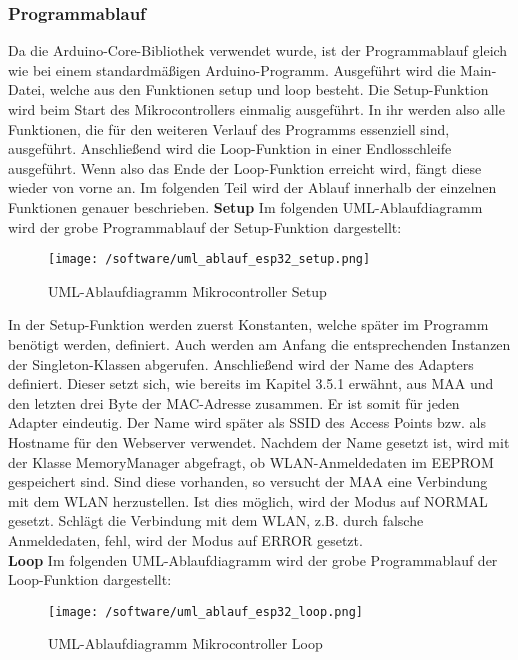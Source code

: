 \documentclass[11pt, twoside]{article}
\begin{document}
\subsubsection{Programmablauf}
Da die \glqq Arduino-Core\grqq{}-Bibliothek verwendet wurde, ist der Programmablauf gleich wie bei einem standardmäßigen Arduino-Programm. Ausgeführt wird die Main-Datei, welche aus den Funktionen \glqq setup\grqq{} und \glqq loop\grqq{} besteht. Die Setup-Funktion wird beim Start des Mikrocontrollers einmalig ausgeführt. In ihr werden also alle Funktionen, die für den weiteren Verlauf des Programms essenziell sind, ausgeführt. Anschließend wird die Loop-Funktion in einer Endlosschleife ausgeführt. Wenn also das Ende der Loop-Funktion erreicht wird, fängt diese wieder von vorne an. Im folgenden Teil wird der Ablauf innerhalb der einzelnen Funktionen genauer beschrieben.
\vspace{4mm}\newline
\textbf{Setup} \newline
Im folgenden UML-Ablaufdiagramm wird der grobe Programmablauf der Setup-Funktion dargestellt:
\begin{figure}[H]
	\texttt{[image: /software/uml\_ablauf\_esp32\_setup.png]}
\caption{UML-Ablaufdiagramm Mikrocontroller Setup}
\end{figure}
In der Setup-Funktion werden zuerst Konstanten, welche später im Programm benötigt werden, definiert. Auch werden am Anfang die entsprechenden Instanzen der Singleton-Klassen abgerufen. Anschließend wird der Name des Adapters definiert. Dieser setzt sich, wie bereits im Kapitel 3.5.1 erwähnt, aus \glqq MAA\grqq{} und den letzten drei Byte der MAC-Adresse zusammen. Er ist somit für jeden Adapter eindeutig. Der Name wird später als SSID des Access Points bzw. als Hostname für den Webserver verwendet. Nachdem der Name gesetzt ist, wird mit der Klasse \glqq MemoryManager\grqq{} abgefragt, ob WLAN-Anmeldedaten im EEPROM gespeichert sind. Sind diese vorhanden, so versucht der MAA eine Verbindung mit dem WLAN herzustellen. Ist dies möglich, wird der Modus auf \glqq NORMAL\grqq{} gesetzt. Schlägt die Verbindung mit dem WLAN, z.B. durch falsche Anmeldedaten, fehl, wird der Modus auf \glqq ERROR\grqq{} gesetzt. \newline \\
\textbf{Loop} \newline
Im folgenden UML-Ablaufdiagramm wird der grobe Programmablauf der Loop-Funktion dargestellt:
\begin{figure}[H]
	\texttt{[image: /software/uml\_ablauf\_esp32\_loop.png]}
	\caption{UML-Ablaufdiagramm Mikrocontroller Loop}
\end{figure}
\end{document}
